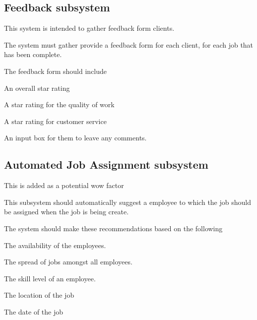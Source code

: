 \documentclass{article}
\begin{document}
	\subsection*{Feedback subsystem}	
		\begin{list}{R.}{}
			\item This system is intended to gather feedback form clients.
			\item The system must gather provide a feedback form for each client, for each job that has been complete.
			\item The feedback form should include 
			\begin{list}{R..}{}
				\item An overall star rating 
				\item A star rating for the quality of work 
				\item A star rating for customer service
				\item An input box for them to leave any comments.
			\end{list}
		\end{list}
		
	
	\subsection*{Automated Job Assignment subsystem}
	This is added as a potential wow factor
	\begin{list}{R.}{}
		\item This subsystem should automatically suggest a employee to which the job should be assigned when the job is being create. 
		\item The system should make these recommendations based on the following
		\begin{list}{R..}{}
			\item The availability of the employees.
			\item The spread of jobs amongst all employees.
			\item The skill level of an employee.
			\item The location of the job
			\item The date of the job
		\end{list}
	\end{list}
\end{document}
